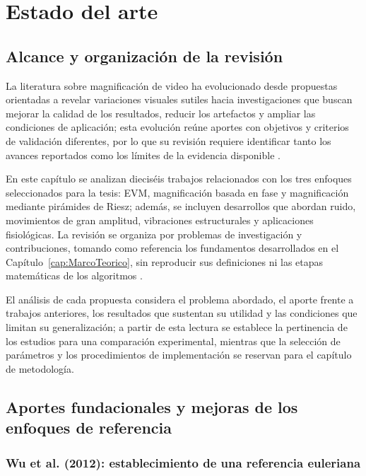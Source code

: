 ﻿\chapter{Estado del arte}
\label{cap:estado_arte}
\glsresetall

\section{Alcance y organización de la revisión}

La literatura sobre magnificación de video ha evolucionado desde propuestas orientadas a revelar variaciones visuales sutiles hacia investigaciones que buscan mejorar la calidad de los resultados, reducir los artefactos y ampliar las condiciones de aplicación; esta evolución reúne aportes con objetivos y criterios de validación diferentes, por lo que su revisión requiere identificar tanto los avances reportados como los límites de la evidencia disponible \cite{ahmed2023overview,smieja2021motion}.

En este capítulo se analizan dieciséis trabajos relacionados con los tres enfoques seleccionados para la tesis: \gls{EVM}, magnificación basada en fase y magnificación mediante pirámides de Riesz; además, se incluyen desarrollos que abordan ruido, movimientos de gran amplitud, vibraciones estructurales y aplicaciones fisiológicas. La revisión se organiza por problemas de investigación y contribuciones, tomando como referencia los fundamentos desarrollados en el Capítulo~\ref{cap:MarcoTeorico}, sin reproducir sus definiciones ni las etapas matemáticas de los algoritmos \cite{wu2012eulerian,wadhwa2013phase,wadhwa2014riesz,ahmed2023overview}.

El análisis de cada propuesta considera el problema abordado, el aporte frente a trabajos anteriores, los resultados que sustentan su utilidad y las condiciones que limitan su generalización; a partir de esta lectura se establece la pertinencia de los estudios para una comparación experimental, mientras que la selección de parámetros y los procedimientos de implementación se reservan para el capítulo de metodología.

\section{Aportes fundacionales y mejoras de los enfoques de referencia}

\subsection{Wu et al. (2012): establecimiento de una referencia euleriana}


